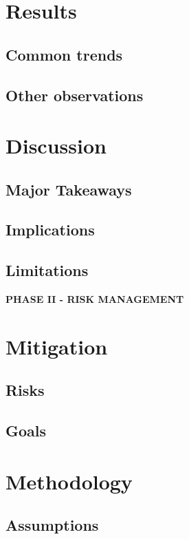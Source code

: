 \documentclass[11pt,a4paper]{article}
\begin{document}
\newpage

\section{Results}
\subsection{Common trends}
\subsection{Other observations}

\newpage

\section{Discussion}
\subsection{Major Takeaways}
\subsection{Implications}
\subsection{Limitations}

\newpage

\begin{center}
    \textbf{PHASE II - RISK MANAGEMENT}
\end{center}

\newpage

\section{Mitigation}
\subsection{Risks}
\subsection{Goals}

\newpage

\section{Methodology}
\subsection{Assumptions}
\end{document}
